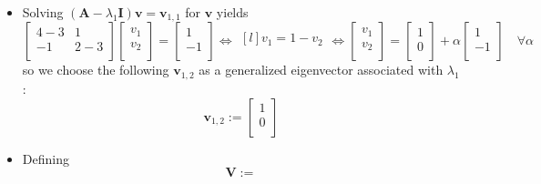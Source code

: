 \documentclass[12pt,a4paper]{article}
\begin{document}
\begin{itemize}
\begin{itemize}
  \item Solving $(\bm{A}-\lambda_{1}\bm{I})\bm{v}=\bm{v}_{1,1}$ for $\bm{v}$ yields
    \begin{equation}\nonumber%
      \begin{bmatrix}
        4 - 3 & 1 \\
        - 1 & 2 - 3 \\
      \end{bmatrix}
      \begin{bmatrix}
        v_{1} \\
        v_{2} \\
      \end{bmatrix}
      = 
      \begin{bmatrix}
        1 \\
        -1 \\
      \end{bmatrix}
      \iff
      \begin{matrix*}[l]
        v_{1} = 1 -v_{2} \\
      \end{matrix*}
      \iff
      \begin{bmatrix}
        v_{1} \\
        v_{2} \\
      \end{bmatrix}
      =
      \begin{bmatrix}
        1 \\
        0 \\
      \end{bmatrix}
      +
      \alpha
      \begin{bmatrix}
        1 \\
        -1 \\
      \end{bmatrix}
      \quad \forall \alpha
    \end{equation}
    so we choose the following $\bm{v}_{1,2}$ as a generalized eigenvector associated with $\lambda_{1}$:
    \begin{equation}\nonumber%
      \bm{v}_{1,2} :=
      \begin{bmatrix}
        1 \\
        0 \\
      \end{bmatrix}
    \end{equation}
  \item Defining
    \begin{equation}\nonumber%
      \bm{V} :=

\end{equation}
\end{itemize}
\end{itemize}
\end{document}
